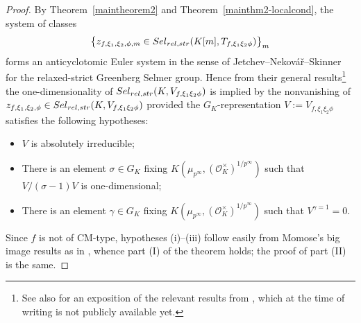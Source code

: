 \documentclass[10pt,letterpaper]{amsart}
\theoremstyle{plain}
\newtheorem{thm}{Theorem}[subsection] %
\theoremstyle{definition}
\theoremstyle{definition}
\theoremstyle{plain}
\theoremstyle{plain}
\theoremstyle{plain}
\theoremstyle{remark}
\numberwithin{equation}{section}
\newcommand{\Sel}{Sel}
\newcommand{\fkl}{\mathfrak{l}}
\newcommand{\relstr}{{{\rm rel},{\rm str}}}
\DeclareMathOperator{\La}{\Lambda}
\def\cO{\mathcal O}
\newcommand{\Q}{\mathbf{Q}}
\newcommand{\Z}{\mathbf{Z}}
\def\Sel{{\rm Sel}}
\begin{document}
\begin{proof}
By Theorem~\ref{maintheorem2} and Theorem~\ref{mainthm2-localcond}, the system of classes 
\begin{equation}\label{eq:ES-rel-str}
\bigl\{z_{f,\xi_1,\xi_2,\phi,m}\in\Sel_{\relstr}(K[m],T_{f,\xi_1\xi_2\phi})\bigr\}_m
\end{equation}
forms an anticyclotomic Euler system in the sense of Jetchev--Nekov\'a{\v r}--Skinner \cite{JNS} for the relaxed-strict Greenberg Selmer group. 
Hence from their general results\footnote{See also \cite[\S{8.1}]{ACR} for an exposition of the relevant results from \cite{JNS}, which at the time of writing is not publicly available yet.} the one-dimensionality of $\Sel_{\relstr}(K,V_{f,\xi_1\xi_2\phi})$ is implied by the nonvanishing of $z_{f,\xi_1,\xi_2,\phi}\in\Sel_{\relstr}(K,V_{f,\xi_1\xi_2\phi})$ provided the $G_K$-representation $V:=V_{f,\xi_1\xi_2\phi}$ satisfies the following hypotheses:
\begin{itemize}
    \item[(i)] $V$ is absolutely irreducible;
    \item[(ii)] There is an element $\sigma\in G_K$ fixing $K(\mu_{p^\infty},(\cO_K^\times)^{1/p^\infty})$ such that $V/(\sigma-1)V$ is one-dimensional;
    \item[(iii)] There is an element $\gamma\in G_K$ fixing $K(\mu_{p^\infty},(\cO_K^\times)^{1/p^\infty})$ such that $V^{\gamma=1}=0$.
\end{itemize}

Since $f$ is not of CM-type, hypotheses (i)--(iii) follow easily from Momose's big image results \cite{Momo} as in \cite[Prop.~7.1.4]{LLZ-K}, whence part (I) of the theorem holds; the proof of part (II) is the same.
\end{proof}






\end{document}
